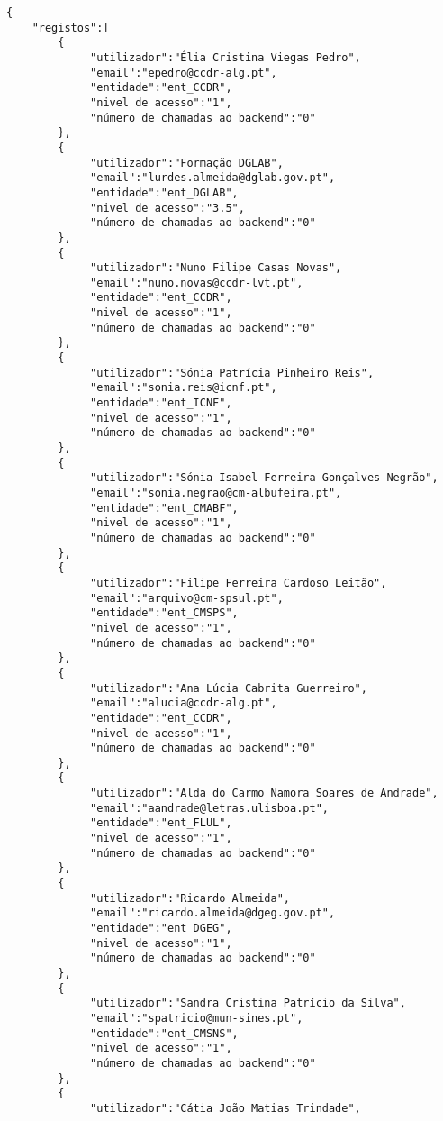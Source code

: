 \documentclass[11pt,a4paper]{report}%
\begin{document}
\begin{verbatim}
{
    "registos":[
        {
             "utilizador":"Élia Cristina Viegas Pedro",
             "email":"epedro@ccdr-alg.pt",
             "entidade":"ent_CCDR",
             "nivel de acesso":"1",
             "número de chamadas ao backend":"0"
        },
        {
             "utilizador":"Formação DGLAB",
             "email":"lurdes.almeida@dglab.gov.pt",
             "entidade":"ent_DGLAB",
             "nivel de acesso":"3.5",
             "número de chamadas ao backend":"0"
        },
        {
             "utilizador":"Nuno Filipe Casas Novas",
             "email":"nuno.novas@ccdr-lvt.pt",
             "entidade":"ent_CCDR",
             "nivel de acesso":"1",
             "número de chamadas ao backend":"0"
        },
        {
             "utilizador":"Sónia Patrícia Pinheiro Reis",
             "email":"sonia.reis@icnf.pt",
             "entidade":"ent_ICNF",
             "nivel de acesso":"1",
             "número de chamadas ao backend":"0"
        },
        {
             "utilizador":"Sónia Isabel Ferreira Gonçalves Negrão",
             "email":"sonia.negrao@cm-albufeira.pt",
             "entidade":"ent_CMABF",
             "nivel de acesso":"1",
             "número de chamadas ao backend":"0"
        },
        {
             "utilizador":"Filipe Ferreira Cardoso Leitão",
             "email":"arquivo@cm-spsul.pt",
             "entidade":"ent_CMSPS",
             "nivel de acesso":"1",
             "número de chamadas ao backend":"0"
        },
        {
             "utilizador":"Ana Lúcia Cabrita Guerreiro",
             "email":"alucia@ccdr-alg.pt",
             "entidade":"ent_CCDR",
             "nivel de acesso":"1",
             "número de chamadas ao backend":"0"
        },
        {
             "utilizador":"Alda do Carmo Namora Soares de Andrade",
             "email":"aandrade@letras.ulisboa.pt",
             "entidade":"ent_FLUL",
             "nivel de acesso":"1",
             "número de chamadas ao backend":"0"
        },
        {
             "utilizador":"Ricardo Almeida",
             "email":"ricardo.almeida@dgeg.gov.pt",
             "entidade":"ent_DGEG",
             "nivel de acesso":"1",
             "número de chamadas ao backend":"0"
        },
        {
             "utilizador":"Sandra Cristina Patrício da Silva",
             "email":"spatricio@mun-sines.pt",
             "entidade":"ent_CMSNS",
             "nivel de acesso":"1",
             "número de chamadas ao backend":"0"
        },
        {
             "utilizador":"Cátia João Matias Trindade",

\end{verbatim}
\end{document}
